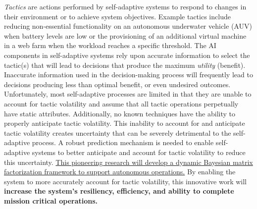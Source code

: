 \documentclass[12pt]{article}
\begin{document}
% 





\emph{Tactics} are actions performed by self-adaptive systems to respond to changes in their environment or to achieve system objectives. Example tactics include reducing non-essential functionality on an autonomous underwater vehicle (AUV) when battery levels are low or the provisioning of an additional virtual machine in a web farm when the workload reaches a specific threshold. The AI components in self-adaptive systems rely upon accurate information to select the tactic(s) that will lead to decisions that produce the maximum \emph{utility} (benefit). Inaccurate information used in the decision-making process will frequently lead to decisions producing less than optimal benefit, or even undesired outcomes. Unfortunately, most self-adaptive processes are limited in that they are unable to account for tactic volatility and assume that all tactic operations perpetually have static attributes. Additionally, no known techniques have the ability to properly anticipate tactic volatility. This inability to account for and anticipate tactic volatility creates uncertainty that can be severely detrimental to the self-adaptive process. A robust prediction mechanism is needed to enable self-adaptive systems to better anticipate and account for tactic volatility to reduce this uncertainty. \ul{This pioneering research will develop a dynamic Bayesian matrix factorization framework to support autonomous operations.} By enabling the system to more accurately account for tactic volatility, this innovative work will {\bf increase the system's resiliency, efficiency, and ability to complete mission critical operations.}

\end{document}
